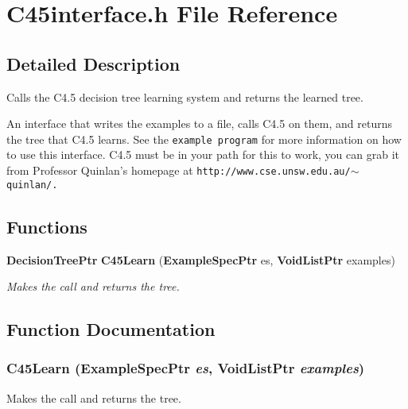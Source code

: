 \section{C45interface.h File Reference}
\label{C45interface_8h}


\subsection{Detailed Description}
Calls the C4.5 decision tree learning system and returns the learned tree. 

An interface that writes the examples to a file, calls C4.5 on them, and returns the tree that C4.5 learns. See the {\tt example program} for more information on how to use this interface. C4.5 must be in your path for this to work, you can grab it from Professor Quinlan's homepage at {\tt http://www.cse.unsw.edu.au/$\sim$quinlan/.}

\subsection*{Functions}
\begin{CompactItemize}
\item 
{\bf Decision\-Tree\-Ptr} {\bf C45Learn} ({\bf Example\-Spec\-Ptr} es, {\bf Void\-List\-Ptr} examples)
\begin{CompactList}\small\item\em Makes the call and returns the tree. \item\end{CompactList}\end{CompactItemize}


\subsection{Function Documentation}
\subsubsection{ C45Learn ({\bf Example\-Spec\-Ptr} {\em es}, {\bf Void\-List\-Ptr} {\em examples})}\label{C45interface_8h_a0}


Makes the call and returns the tree. 

